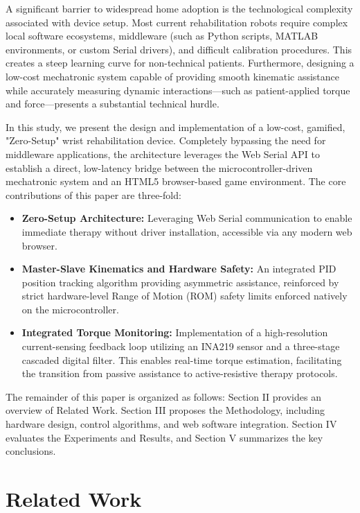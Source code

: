 \documentclass[conference]{IEEEtran}
\begin{document}
A significant barrier to widespread home adoption is the technological complexity associated with device setup. Most current rehabilitation robots require complex local software ecosystems, middleware (such as Python scripts, MATLAB environments, or custom Serial drivers), and difficult calibration procedures. This creates a steep learning curve for non-technical patients. Furthermore, designing a low-cost mechatronic system capable of providing smooth kinematic assistance while accurately measuring dynamic interactions—such as patient-applied torque and force—presents a substantial technical hurdle.

In this study, we present the design and implementation of a low-cost, gamified, "Zero-Setup" wrist rehabilitation device. Completely bypassing the need for middleware applications, the architecture leverages the Web Serial API to establish a direct, low-latency bridge between the microcontroller-driven mechatronic system and an HTML5 browser-based game environment. The core contributions of this paper are three-fold:
\begin{itemize}
    \item \textbf{Zero-Setup Architecture:} Leveraging Web Serial communication to enable immediate therapy without driver installation, accessible via any modern web browser.
    \item \textbf{Master-Slave Kinematics and Hardware Safety:} An integrated PID position tracking algorithm providing asymmetric assistance, reinforced by strict hardware-level Range of Motion (ROM) safety limits enforced natively on the microcontroller.
    \item \textbf{Integrated Torque Monitoring:} Implementation of a high-resolution current-sensing feedback loop utilizing an INA219 sensor and a three-stage cascaded digital filter. This enables real-time torque estimation, facilitating the transition from passive assistance to active-resistive therapy protocols.
\end{itemize}

The remainder of this paper is organized as follows: Section II provides an overview of Related Work. Section III proposes the Methodology, including hardware design, control algorithms, and web software integration. Section IV evaluates the Experiments and Results, and Section V summarizes the key conclusions.

\section{Related Work}
\end{document}
